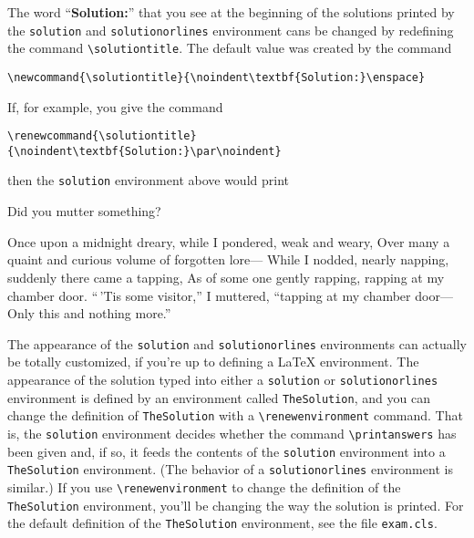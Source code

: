 \documentclass[12pt]{exam}
\begin{document}
The word ``\textbf{Solution:}'' that you see at the beginning of the
solutions printed by the \verb"solution" and \verb"solutionorlines"
environment cans be changed by redefining the command
\verb"\solutiontitle".  The default value was created by the command
\begin{center}
\verb"\newcommand{\solutiontitle}{\noindent\textbf{Solution:}\enspace}"
\end{center}
If, for example, you give the command
\begin{center}
\verb"\renewcommand{\solutiontitle}{\noindent\textbf{Solution:}\par\noindent}"
\end{center}
then the \verb"solution" environment above would print
\renewcommand{\solutiontitle}{\noindent\textbf{Solution:}\par\noindent}
\par\bigskip
\begin{questions}
\question Did you mutter something?

\begin{TheSolution}
  Once upon a midnight dreary, while I pondered, weak and weary, Over
  many a quaint and curious volume of forgotten lore--- While I
  nodded, nearly napping, suddenly there came a tapping, As of some
  one gently rapping, rapping at my chamber door.  ``\,'Tis some
  visitor,'' I muttered, ``tapping at my chamber door--- Only this and
  nothing more.''
\end{TheSolution}
\end{questions}
\renewcommand{\solutiontitle}{\noindent\textbf{Solution:}\enspace}


\bigskip

The appearance of the \verb"solution" and \verb"solutionorlines"
environments can actually be totally customized, if you're up to
defining a \LaTeX{} environment.  The appearance of the solution typed
into either a \verb"solution" or \verb"solutionorlines" environment is
defined by an environment called \verb"TheSolution", and you can
change the definition of \verb"TheSolution" with a
\verb"\renewenvironment" command.  That is, the \verb"solution"
environment decides whether the command \verb"\printanswers" has been
given and, if so, it feeds the contents of the \verb"solution"
environment into a \verb"TheSolution" environment.  (The behavior of a
\verb"solutionorlines" environment is similar.)  If you use
\verb"\renewenvironment" to change the definition of the
\verb"TheSolution" environment, you'll be changing the way the
solution is printed.  For the default definition of the
\verb"TheSolution" environment, see the file \verb"exam.cls".
\end{document}
